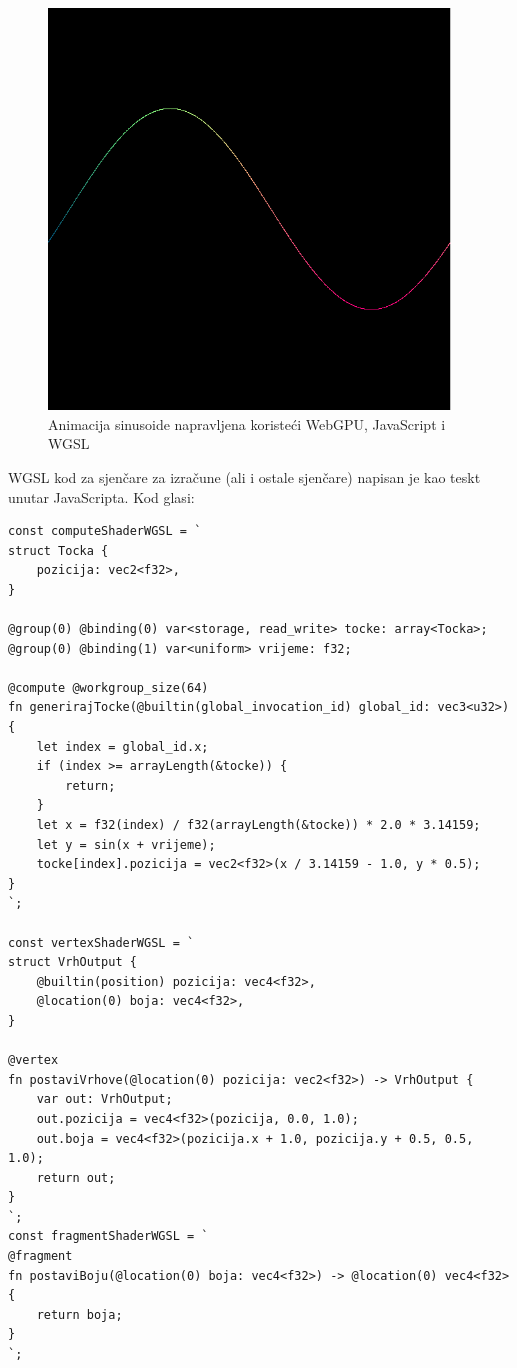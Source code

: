 \documentclass{foi}
\begin{document}
\begin{figure}[H]
	\centering
	\includegraphics[width=0.95\textwidth]{slike/40_WebGPUSinusoida.png}
	\captionsetup{justification=centering}
	\caption{Animacija sinusoide napravljena koristeći WebGPU, JavaScript i WGSL}
	\label{fig:WebGPUSinusoida}
\end{figure}

WGSL kod za sjenčare za izračune (ali i ostale sjenčare) napisan je kao teskt unutar JavaScripta. Kod glasi:

\begin{verbatim}
const computeShaderWGSL = `
struct Tocka {
	pozicija: vec2<f32>,
}

@group(0) @binding(0) var<storage, read_write> tocke: array<Tocka>;
@group(0) @binding(1) var<uniform> vrijeme: f32;

@compute @workgroup_size(64)
fn generirajTocke(@builtin(global_invocation_id) global_id: vec3<u32>) {
	let index = global_id.x;
	if (index >= arrayLength(&tocke)) {
		return;
	}
	let x = f32(index) / f32(arrayLength(&tocke)) * 2.0 * 3.14159;
	let y = sin(x + vrijeme);
	tocke[index].pozicija = vec2<f32>(x / 3.14159 - 1.0, y * 0.5);
}
`;

const vertexShaderWGSL = `
struct VrhOutput {
	@builtin(position) pozicija: vec4<f32>,
	@location(0) boja: vec4<f32>,
}

@vertex
fn postaviVrhove(@location(0) pozicija: vec2<f32>) -> VrhOutput {
	var out: VrhOutput;
	out.pozicija = vec4<f32>(pozicija, 0.0, 1.0);
	out.boja = vec4<f32>(pozicija.x + 1.0, pozicija.y + 0.5, 0.5, 1.0);
	return out;
}
`;
const fragmentShaderWGSL = `
@fragment
fn postaviBoju(@location(0) boja: vec4<f32>) -> @location(0) vec4<f32> {
	return boja;
}
`;
\end{verbatim}
\end{document}
